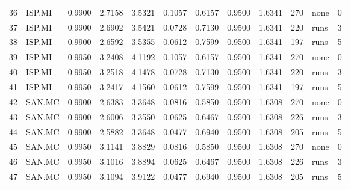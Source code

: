 \begin{table}
\begin{tabular}{llrrrrrrrrlr}
36 & ISP.MI & 0.9900 & 2.7158 & 3.5321 & 0.1057 & 0.6157 & 0.9500 & 1.6341 & 270 & none & 0 \\
37 & ISP.MI & 0.9900 & 2.6902 & 3.5421 & 0.0728 & 0.7130 & 0.9500 & 1.6341 & 220 & runs & 3 \\
38 & ISP.MI & 0.9900 & 2.6592 & 3.5355 & 0.0612 & 0.7599 & 0.9500 & 1.6341 & 197 & runs & 5 \\
39 & ISP.MI & 0.9950 & 3.2408 & 4.1192 & 0.1057 & 0.6157 & 0.9500 & 1.6341 & 270 & none & 0 \\
40 & ISP.MI & 0.9950 & 3.2518 & 4.1478 & 0.0728 & 0.7130 & 0.9500 & 1.6341 & 220 & runs & 3 \\
41 & ISP.MI & 0.9950 & 3.2417 & 4.1560 & 0.0612 & 0.7599 & 0.9500 & 1.6341 & 197 & runs & 5 \\
42 & SAN.MC & 0.9900 & 2.6383 & 3.3648 & 0.0816 & 0.5850 & 0.9500 & 1.6308 & 270 & none & 0 \\
43 & SAN.MC & 0.9900 & 2.6006 & 3.3550 & 0.0625 & 0.6467 & 0.9500 & 1.6308 & 226 & runs & 3 \\
44 & SAN.MC & 0.9900 & 2.5882 & 3.3648 & 0.0477 & 0.6940 & 0.9500 & 1.6308 & 205 & runs & 5 \\
45 & SAN.MC & 0.9950 & 3.1141 & 3.8829 & 0.0816 & 0.5850 & 0.9500 & 1.6308 & 270 & none & 0 \\
46 & SAN.MC & 0.9950 & 3.1016 & 3.8894 & 0.0625 & 0.6467 & 0.9500 & 1.6308 & 226 & runs & 3 \\
47 & SAN.MC & 0.9950 & 3.1094 & 3.9122 & 0.0477 & 0.6940 & 0.9500 & 1.6308 & 205 & runs & 5 \\
\bottomrule
\end{tabular}
\end{table}
